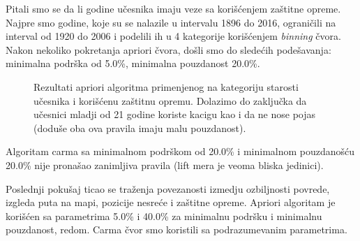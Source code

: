 \documentclass[a4paper,10pt]{article}
\begin{document}
Pitali smo se da li godine učesnika imaju veze sa korišćenjem zaštitne opreme. Najpre smo godine, koje su se nalazile u intervalu
1896 do 2016, ograničili na interval od 1920 do 2006 i podelili ih u 4 kategorije korišćenjem \textit{binning} čvora. Nakon nekoliko
pokretanja apriori čvora, došli smo do sledećih podešavanja: minimalna podrška od 5.0\%, minimalna pouzdanost 20.0\%.

\begin{figure}[h!]
 \centering
 \caption{Rezultati apriori algoritma primenjenog na kategoriju starosti učesnika i korišćenu zaštitnu opremu. Dolazimo do 
 zaključka da učesnici mladji od 21 godine koriste kacigu kao i da ne nose pojas (doduše oba ova pravila imaju malu pouzdanost). }
\end{figure}

Algoritam carma sa minimalnom podrškom od 20.0\% i minimalnom pouzdanošću 20.0\% nije pronašao zanimljiva pravila (lift mera je veoma
bliska jedinici).

Poslednji pokušaj ticao se traženja povezanosti izmedju ozbiljnosti povrede, izgleda puta na mapi, pozicije nesreće i zaštitne opreme. 
Apriori algoritam je korišćen sa parametrima 5.0\% i 40.0\% za minimalnu podršku i minimalnu pouzdanost, redom. Carma čvor smo koristili
sa podrazumevanim parametrima. 
\end{document}
